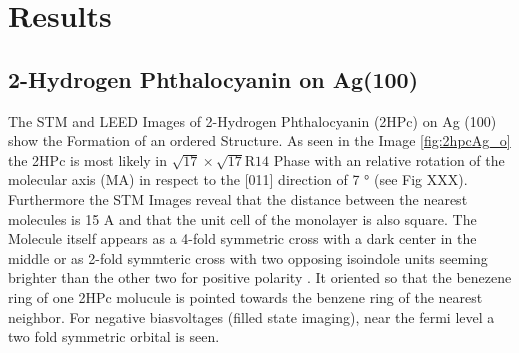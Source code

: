 \chapter{Results}
\section{2-Hydrogen Phthalocyanin on Ag(100)}
\label{sec:results}The STM and LEED Images of 2-Hydrogen Phthalocyanin (2HPc) on Ag (100) show the Formation of an ordered Structure.
As seen in the Image \ref{fig:2hpcAg_o} the 2HPc  is most likely in $\sqrt{17} \times  \sqrt{17}\text{R}14$ Phase with an relative rotation of the molecular axis (MA) in respect to the [011] direction of 7 ° (see Fig XXX). 
Furthermore the STM Images reveal that the distance between the nearest molecules is 
15 A and that the unit cell of the monolayer is also square.
\noindent The Molecule itself appears as a 4-fold symmetric cross with a dark center in the middle or as 2-fold symmteric cross with two opposing isoindole units seeming brighter than the other two for positive polarity . 
It oriented so that the benezene ring of one 2HPc molucule is pointed towards the benzene ring of the nearest neighbor. 
For negative biasvoltages (filled state imaging), near the fermi level a two fold symmetric orbital is seen. 
